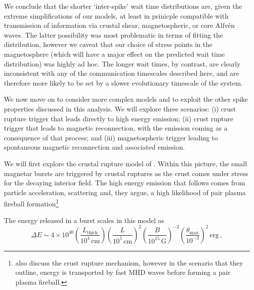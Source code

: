 \documentclass[12pt]{emulateapj}
\begin{document}



We conclude that the shorter `inter-spike' wait time distributions are, given the extreme simplifications of our models, at least in prinicple compatible with transmission of information via crustal shear, magnetospheric, or core Alfv\'en waves.  The latter possibility was most problematic in terms of fitting the distribution, however we caveat that our choice of stress points in the magnetosphere (which will have a major effect on the predicted wait time distribution) was highly ad hoc.   The longer wait times, by contrast, are clearly inconsistent with any of the communication timescales described here, and are therefore more likely to be set by a slower evolutionary timescale of the system.  

We now move on to consider more complex models and to exploit the other spike properties discussed in this analysis. We will explore three scenarios: (i) crust rupture trigger that leads directly to high energy emission; (ii) crust rupture trigger that leads to magnetic reconnection, with the emission coming as a consequence of that process; and (iii) magnetospheric trigger leading to spontaneous magnetic reconnection and associated emission.

We will first explore the crustal rupture model of \citet{thompson1995}. Within this picture, the small magnetar bursts are triggered by crustal ruptures as the crust comes under stress for the decaying interior field. The high energy emission that follows comes from particle acceleration, scattering and, they argue, a high likelihood of pair plasma fireball formation\footnote{\citet{heyl2005b} also discuss the crust rupture mechanism, however in the scenario that they outline, energy is transported by fast MHD waves before forming a pair plasma fireball.}

The energy released in a burst scales in this model \citep[Equation 28ff.\ in ][]{thompson1995} as 
\begin{equation}
\Delta E \sim 4\times 10^{40} \left(\frac{L_{\mathrm{thick}}}{10^{4}\,\mathrm{cm}} \right) \left( \frac{L}{10^{5}\,\mathrm{cm}}\right)^2 \left( \frac{B}{10^{15}\,\mathrm{G}}\right)^{-2} \left(\frac{\theta_\mathrm{max}}{10^{-3}}\right)^2 \, \mathrm{erg} \, ,
\end{equation}
\end{document}
